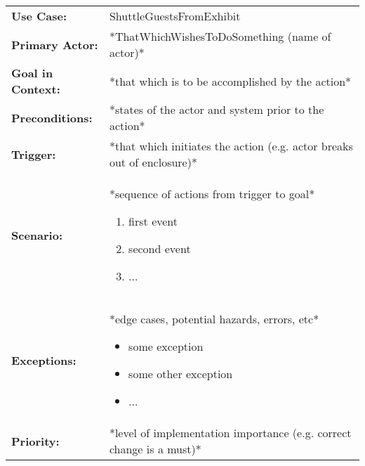 \documentclass[12pt]{article}
\begin{document}
    \begin{table}[H]
    \begin{tabular}{lp{9.9cm}}
        \hline
        \textbf{Use Case:}                     & ShuttleGuestsFromExhibit \\

        \textbf{Primary Actor:}                & *ThatWhichWishesToDoSomething (name of actor)*\\

        \textbf{Goal in Context:}              & *that which is to be accomplished by the action* \\

        \textbf{Preconditions:}                & *states of the actor and system prior to the action* \\

        \textbf{Trigger:}                      & *that which initiates the action (e.g. actor breaks out of enclosure)*\\

        \textbf{Scenario:}                     & *sequence of actions from trigger to goal*
                                                 \begin{enumerate}
                                                     \item first event
                                                     \item second event
                                                     \item ...
                                                 \end{enumerate} \\

        \textbf{Exceptions:}                   & *edge cases, potential hazards, errors, etc*
                                                 \begin{itemize}
                                                     \item[] some exception
                                                     \item[] some other exception
                                                     \item[] ...
                                                 \end{itemize}\\

        \textbf{Priority:}                     & *level of implementation importance (e.g. correct change is a must)*\\


\end{tabular}
\end{table}
\end{document}
